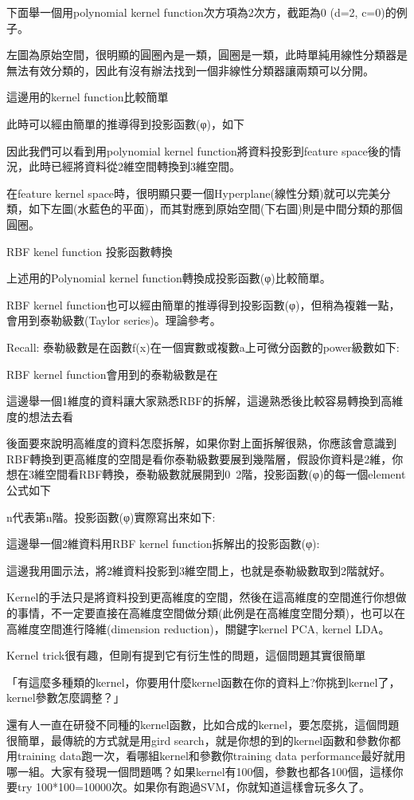 \documentclass[12pt,a4paper]{amsart}
\begin{document}
下面舉一個用polynomial kernel function次方項為2次方，截距為0 (d=2, c=0)的例子。

左圖為原始空間，很明顯的圓圈內是一類，圓圈是一類，此時單純用線性分類器是無法有效分類的，因此有沒有辦法找到一個非線性分類器讓兩類可以分開。


這邊用的kernel function比較簡單


此時可以經由簡單的推導得到投影函數(φ)，如下


因此我們可以看到用polynomial kernel function將資料投影到feature space後的情況，此時已經將資料從2維空間轉換到3維空間。


在feature kernel space時，很明顯只要一個Hyperplane(線性分類)就可以完美分類，如下左圖(水藍色的平面)，而其對應到原始空間(下右圖)則是中間分類的那個圓圈。


RBF kenel function 投影函數轉換

上述用的Polynomial kernel function轉換成投影函數(φ)比較簡單。

RBF kernel function也可以經由簡單的推導得到投影函數(φ)，但稍為複雜一點，會用到泰勒級數(Taylor series)。理論參考。

Recall: 泰勒級數是在函數f(x)在一個實數或複數a上可微分函數的power級數如下:


RBF kernel function會用到的泰勒級數是在


這邊舉一個1維度的資料讓大家熟悉RBF的拆解，這邊熟悉後比較容易轉換到高維度的想法去看


後面要來說明高維度的資料怎麼拆解，如果你對上面拆解很熟，你應該會意識到RBF轉換到更高維度的空間是看你泰勒級數要展到幾階層，假設你資料是2維，你想在3維空間看RBF轉換，泰勒級數就展開到0~2階，投影函數(φ)的每一個element公式如下


n代表第n階。投影函數(φ)實際寫出來如下:


這邊舉一個2維資料用RBF kernel function拆解出的投影函數(φ):


這邊我用圖示法，將2維資料投影到3維空間上，也就是泰勒級數取到2階就好。



Kernel的手法只是將資料投到更高維度的空間，然後在這高維度的空間進行你想做的事情，不一定要直接在高維度空間做分類(此例是在高維度空間分類)，也可以在高維度空間進行降維(dimension reduction)，關鍵字kernel PCA, kernel LDA。

Kernel trick很有趣，但剛有提到它有衍生性的問題，這個問題其實很簡單

「有這麼多種類的kernel，你要用什麼kernel函數在你的資料上?你挑到kernel了，kernel參數怎麼調整？」

還有人一直在研發不同種的kernel函數，比如合成的kernel，要怎麼挑，這個問題很簡單，最傳統的方式就是用gird search，就是你想的到的kernel函數和參數你都用training data跑一次，看哪組kernel和參數你training data performance最好就用哪一組。大家有發現一個問題嗎？如果kernel有100個，參數也都各100個，這樣你要try 100*100=10000次。如果你有跑過SVM，你就知道這樣會玩多久了。
\end{document}
